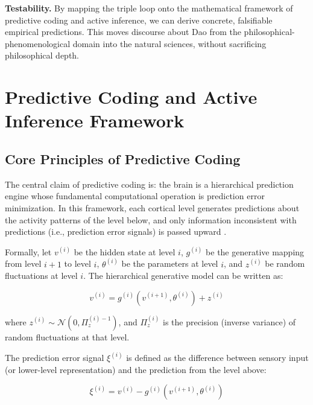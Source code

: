 \documentclass[11pt,a4paper]{article}
\begin{document}
\textbf{Testability.} By mapping the triple loop onto the mathematical framework of predictive coding and active inference, we can derive concrete, falsifiable empirical predictions. This moves discourse about Dao from the philosophical-phenomenological domain into the natural sciences, without sacrificing philosophical depth.

\section{Predictive Coding and Active Inference Framework}

\subsection{Core Principles of Predictive Coding}

The central claim of predictive coding is: the brain is a hierarchical prediction engine whose fundamental computational operation is prediction error minimization. In this framework, each cortical level generates predictions about the activity patterns of the level below, and only information inconsistent with predictions (i.e., prediction error signals) is passed upward \cite{Rao1999,Friston2010,Clark2015}.

Formally, let $v^{(i)}$ be the hidden state at level $i$, $g^{(i)}$ be the generative mapping from level $i+1$ to level $i$, $\theta^{(i)}$ be the parameters at level $i$, and $z^{(i)}$ be random fluctuations at level $i$. The hierarchical generative model can be written as:

\begin{equation}
v^{(i)} = g^{(i)}(v^{(i+1)}, \theta^{(i)}) + z^{(i)}
\label{eq:gen_model}
\end{equation}

where $z^{(i)} \sim \mathcal{N}(0, \Pi_{z}^{(i)-1})$, and $\Pi_{z}^{(i)}$ is the precision (inverse variance) of random fluctuations at that level.

The prediction error signal $\xi^{(i)}$ is defined as the difference between sensory input (or lower-level representation) and the prediction from the level above:

\begin{equation}
\xi^{(i)} = v^{(i)} - g^{(i)}(v^{(i+1)}, \theta^{(i)})
\label{eq:pred_error}
\end{equation}
\end{document}
